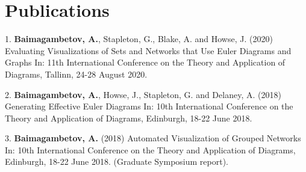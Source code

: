 \documentclass[a4paper,11pt]{article} %
\begin{document}
\begin{center}
\begin{tabular}{rl}





\end{tabular}
\end{center}



\section{Publications}

1. \textbf{Baimagambetov, A.}, Stapleton, G., Blake, A. and Howse, J. (2020)
Evaluating Visualizations of Sets and Networks that Use Euler Diagrams and Graphs In:
11th International Conference on the Theory and Application of Diagrams, Tallinn, 24-28 August 2020.

2. \textbf{Baimagambetov, A.}, Howse, J., Stapleton, G. and Delaney, A. (2018)
Generating Effective Euler Diagrams In:
10th International Conference on the Theory and Application of Diagrams, Edinburgh, 18-22 June 2018.

3. \textbf{Baimagambetov, A.} (2018)
Automated Visualization of Grouped Networks In:
10th International Conference on the Theory and Application of Diagrams, Edinburgh, 18-22 June 2018.
(Graduate Symposium report).
\end{document}
